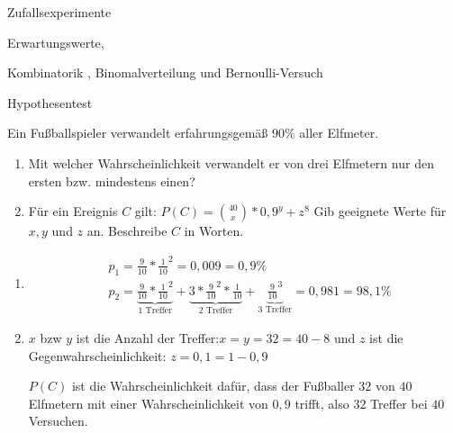 


\begin{inhalt}
	\item Zufallsexperimente 
	\item Erwartungswerte,
	\item Kombinatorik , Binomalverteilung und Bernoulli-Versuch 
	\item Hypothesentest 
\end{inhalt}

Ein Fußballspieler verwandelt erfahrungsgemäß $90\%$ aller Elfmeter.
\begin{enumerate}
	\item Mit welcher Wahrscheinlichkeit verwandelt er von drei Elfmetern nur den ersten bzw. mindestens einen?
	\item Für ein Ereignis $C$ gilt: $P(C)=\binom{40}{x}*0,9^y+z^8$ Gib geeignete Werte für $x,y$ und $z$ an. Beschreibe $C$ in Worten.
\end{enumerate}
\begin{lsg}{}
	\begin{enumerate}
		\item \begin{align*}
			&p_1=\frac 9{10}*\frac1{10}^2=0,009=0,9\%\\
			&p_2=\underbrace{\frac 9 {10}*\frac 1{10}^2}_{\text{1 Treffer}}
						+\underbrace{3* \frac 9 {10}^2*\frac 1{10}}_{\text{2 Treffer}}
						+\underbrace{\frac 9 {10}^3}_{\text{3 Treffer}} = 0,981=98,1\%
					\end{align*}
		\item $x$ bzw $y$ ist die Anzahl der Treffer:$x=y=32=40-8$ und $z$ ist die Gegenwahrscheinlichkeit: $z=0,1=1-0,9$

		$P(C)$ ist die Wahrscheinlichkeit dafür, dass der Fußballer $32$ von $40$ Elfmetern mit einer Wahrscheinlichkeit von $0,9$ trifft, also $32$ Treffer bei $40$ Versuchen.
	\end{enumerate}
\end{lsg}


